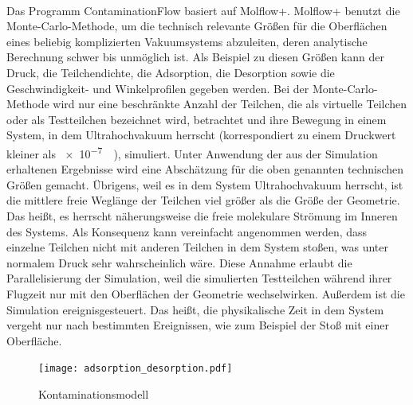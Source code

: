 \documentclass{listhesis}
\begin{document}
\paragraph{}
Das Programm ContaminationFlow basiert auf Molflow+. Molflow+ benutzt die Monte-Carlo-Methode, um die technisch relevante Größen für die Oberflächen eines beliebig komplizierten Vakuumsystems abzuleiten, deren analytische Berechnung schwer bis unmöglich ist. Als Beispiel zu diesen Größen kann der Druck, die Teilchendichte, die Adsorption, die Desorption sowie die Geschwindigkeit- und Winkelprofilen gegeben werden. Bei der Monte-Carlo-Methode wird nur eine beschränkte Anzahl der Teilchen, die als virtuelle Teilchen oder als Testteilchen bezeichnet wird, betrachtet und ihre Bewegung in einem System, in dem Ultrahochvakuum herrscht (korrespondiert zu einem Druckwert kleiner als \SI{e-7}{\milli\Bar}), simuliert. Unter Anwendung der aus der Simulation erhaltenen Ergebnisse wird eine Abschätzung für die oben genannten technischen Größen gemacht. Übrigens, weil es in dem System Ultrahochvakuum herrscht, ist die mittlere freie Weglänge der Teilchen viel größer als die Größe der Geometrie. Das heißt, es herrscht näherungsweise die freie molekulare Strömung im Inneren des Systems. Als Konsequenz kann vereinfacht angenommen werden, dass einzelne Teilchen nicht mit anderen Teilchen in dem System stoßen, was unter normalem Druck sehr wahrscheinlich wäre. Diese Annahme erlaubt die Parallelisierung der Simulation, weil die simulierten Testteilchen während ihrer Flugzeit nur mit den Oberflächen der Geometrie wechselwirken. Außerdem ist die Simulation ereignisgesteuert. Das heißt, die physikalische Zeit in dem System vergeht nur nach bestimmten Ereignissen, wie zum Beispiel der Stoß mit einer Oberfläche. 

\begin{figure}[]
\centering
\texttt{[image: adsorption\_desorption.pdf]}
\caption{Kontaminationsmodell}
\label{fig:model}
\end{figure}
\end{document}
